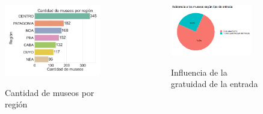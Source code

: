 \documentclass[10pt]{beamer}
\begin{document}
\begin{frame}
\begin{columns}
\begin{figure}
  \vspace{-1.5em}
  \includegraphics[width=0.9\textwidth]{cantidad_museos.png}
  \label{fig:cant_museos}
  \caption{Cantidad de museos por región}
\end{figure}
  \begin{figure}
    \vspace{-2.25em}
    \includegraphics[width=0.9\textwidth]{entradas.png}
    \label{fig:tipos_entradas}
    \caption{Influencia de la gratuidad de la entrada}
    \end{figure}
\end{columns}

\end{frame}
\end{document}
